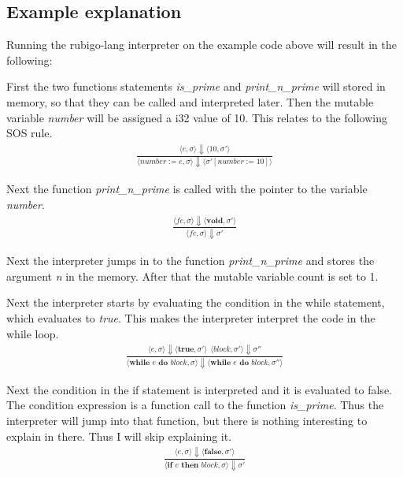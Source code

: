 \documentclass[12pt]{article}
\begin{document}
    \subsection{Example explanation}
	Running the rubigo-lang interpreter on the example code above will result in the following:

	First the two functions statements \emph{is\_prime} and \emph{print\_n\_prime} will stored in memory, so that they can be called and interpreted later. Then the mutable variable \emph{number} will be assigned a i32 value of 10. This relates to the following SOS rule.
	\begin{align*}
		\frac{\langle e, \sigma \rangle\Downarrow \langle 10, \sigma' \rangle}
		{\langle number := e, \sigma \rangle\Downarrow \langle \sigma' [number := 10] \rangle}
	\end{align*}

	Next the function \emph{print\_n\_prime} is called with the pointer to the variable \emph{number}.
	\begin{align*}
		\frac{\langle fc, \sigma \rangle\Downarrow \langle \textbf{void}, \sigma' \rangle}
		{\langle fc, \sigma \rangle\Downarrow \sigma'}
	\end{align*}

	Next the interpreter jumps in to the function \emph{print\_n\_prime} and stores the argument \emph{n} in the memory. After that the mutable variable count is set to 1.

	Next the interpreter starts by evaluating the condition in the while statement, which evaluates to \emph{true}. This makes the interpreter interpret the code in the while loop.
	\begin{align*}
		\frac{\langle e, \sigma \rangle\Downarrow \langle \textbf{true}, \sigma' \rangle \ \
		\langle block, \sigma' \rangle\Downarrow \sigma''}
		{\langle \textbf{while } e \textbf{ do } block, \sigma \rangle\Downarrow \langle \textbf{while } e \textbf{ do } block, \sigma'' \rangle}
	\end{align*}

	Next the condition in the if statement is interpreted and it is evaluated to false. The condition expression is a function call to the function \emph{is\_prime}. Thus the interpreter will jump into that function, but there is nothing interesting to explain in there. Thus I will skip explaining it.
	\begin{align*}
		\frac{\langle e, \sigma \rangle\Downarrow \langle \textbf{false}, \sigma' \rangle}
		{\langle \textbf{if } e \textbf{ then } block, \sigma \rangle\Downarrow \sigma'}
	\end{align*}
\end{document}
